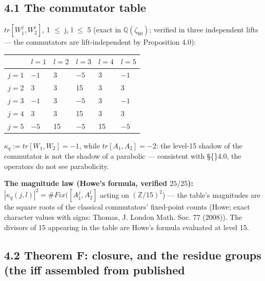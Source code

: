 \documentclass[11pt]{article}
\theoremstyle{plain}
\theoremstyle{definition}
\theoremstyle{remark}
\begin{document}
\subsection{4.1 The commutator table}

\(tr[W_{1}^{j}, W_{2}^{l}]\), 1 \(\le \) j, l \(\le \) 5 (exact in \(\mathbb{Q}(\zeta _{60})\); verified in three independent lifts — the commutators are lift-independent by Proposition 4.0):

\begin{center}\small\begin{tabular}{llllll}\hline

\textbf{} & \textbf{\(l=1\)} & \textbf{\(l=2\)} & \textbf{\(l=3\)} & \textbf{\(l=4\)} & \textbf{\(l=5\)} \\ \hline

\(j=1\) & \(-1\) & 3 & \(-5\) & 3 & \(-1\) \\

\(j=2\) & 3 & 3 & 15 & 3 & 3 \\

\(j=3\) & \(-1\) & 3 & \(-5\) & 3 & \(-1\) \\

\(j=4\) & 3 & 3 & 15 & 3 & 3 \\

\(j=5\) & \(-5\) & 15 & \(-5\) & 15 & \(-5\) \\

\hline\end{tabular}\end{center}

\(\kappa _{q} := tr[W_{1},W_{2}] = -1\), while \(tr[A_{1},A_{2}] = -2\): the level-15 shadow of the commutator is not the shadow of a parabolic — consistent with \S\{\}4.0, the operators do not see parabolicity.

\textbf{The magnitude law (Howe's formula, verified \(25/25\)):} \(|\kappa _{q}(j,l)|^{2} = \#Fix([A_{1}^{j}, A_{2}^{l}]\) acting on \((\mathbb{Z}/15)^{2}\)) — the table's magnitudes are the square roots of the classical commutators' fixed-point counts (Howe; exact character values with signs: Thomas, J. London Math. Soc. 77 (2008)). The divisors of 15 appearing in the table are Howe's formula evaluated at level 15.

\subsection{4.2 Theorem F: closure, and the residue groups (the iff assembled from published}
\end{document}
